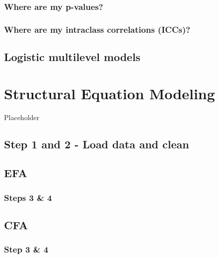 \documentclass[
]{book}
\begin{document}
\hypertarget{where-are-my-p-values}{%
\subsection{Where are my p-values?}\label{where-are-my-p-values}}

\hypertarget{where-are-my-intraclass-correlations-iccs}{%
\subsection{Where are my intraclass correlations (ICCs)?}\label{where-are-my-intraclass-correlations-iccs}}

\hypertarget{logistic-multilevel-models}{%
\section{Logistic multilevel models}\label{logistic-multilevel-models}}

\hypertarget{structural-equation-modeling}{%
\chapter{Structural Equation Modeling}\label{structural-equation-modeling}}

Placeholder

\hypertarget{step-1-and-2---load-data-and-clean}{%
\section{Step 1 and 2 - Load data and clean}\label{step-1-and-2---load-data-and-clean}}

\hypertarget{efa}{%
\section{EFA}\label{efa}}

\hypertarget{steps-3-4}{%
\subsection{Steps 3 \& 4}\label{steps-3-4}}

\hypertarget{cfa}{%
\section{CFA}\label{cfa}}

\hypertarget{step-3-4}{%
\subsection{Step 3 \& 4}\label{step-3-4}}
\end{document}
